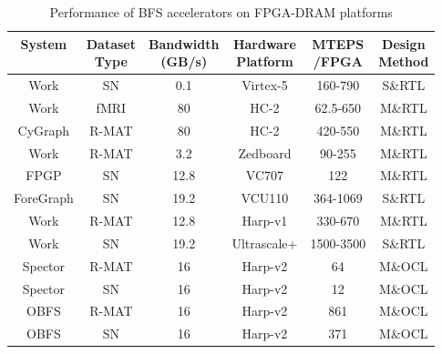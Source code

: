 \begin{table}
  \caption{Performance of BFS accelerators on FPGA-DRAM platforms}
  \label{tab:compare}
    \setlength{\tabcolsep}{4pt} %
  \begin{tabular}{cccccc}
    \toprule
	System & \shortstack[c]{Dataset \\ Type} & \shortstack[c]{Bandwidth\\ (GB/s)} & \shortstack[c]{Hardware\\ Platform} & \shortstack[c]{MTEPS\\ /FPGA} & \shortstack[c]{Design\\ Method}\\
    \midrule
	Work\cite{wang2010message} & SN & 0.1 & Virtex-5 & 160-790 & S\&RTL \\
	Work\cite{betkaoui2012reconfigurable} & fMRI & 80 & HC-2 & 62.5-650 & M\&RTL \\
	CyGraph\cite{attia2014cygraph} & R-MAT & 80 & HC-2 & 420-550 & M\&RTL \\
	Work\cite{umuroglu2015hybrid} & R-MAT & 3.2 & Zedboard & 90-255 & M\&RTL\\
	FPGP\cite{dai2016fpgp} & SN & 12.8 & VC707 & 122 & M\&RTL\\
	ForeGraph\cite{Dai2017foregraph} & SN &19.2 & VCU110 & 364-1069 & S\&RTL\\
	Work\cite{zhou2017accelerating} & R-MAT & 12.8 & Harp-v1 & 330-670 & M\&RTL\\
	Work\cite{yao2018efficient} & SN & 19.2 & Ultrascale+ & 1500-3500 & S\&RTL \\
	Spector \cite{gautier2016spector} & R-MAT & 16 & Harp-v2 & 64 & M\&OCL \\
	Spector \cite{gautier2016spector} & SN & 16 & Harp-v2 & 12 & M\&OCL \\
	\midrule
	OBFS & R-MAT & 16 & Harp-v2 &  861 & M\&OCL \\
	OBFS & SN & 16 & Harp-v2 & 371 & M\&OCL\\
  \bottomrule
\end{tabular}
\vspace{-1em}
\end{table}

